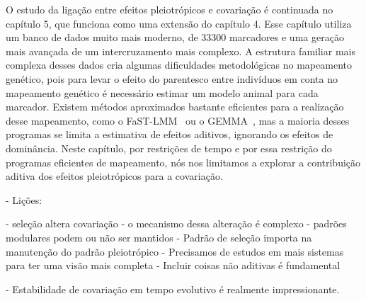\begin{refsection}
O estudo da ligação entre efeitos pleiotrópicos e covariação é continuada no
capítulo 5, que funciona como uma extensão do capítulo 4. Esse capítulo
utiliza um banco de dados muito mais moderno, de 33300 marcadores e uma
geração mais avançada de um intercruzamento mais complexo. A estrutura
familiar mais complexa desses dados cria algumas dificuldades metodológicas no
mapeamento genético, pois para levar o efeito do parentesco entre indivíduos
em conta no mapeamento genético é necessário estimar um modelo animal para
cada marcador. Existem métodos aproximados bastante eficientes para a
realização desse mapeamento, como o FaST-LMM~\parencite{Lippert2011-jn} ou o
GEMMA~\parencite{Zhou2012-zl}, mas a maioria desses programas se limita a
estimativa de efeitos aditivos, ignorando os efeitos de dominância. Neste
capítulo, por restrições de tempo e por essa restrição do programas eficientes
de mapeamento, nós nos limitamos a explorar a contribuição aditiva dos efeitos
pleiotrópicos para a covariação.




- Lições:

	- seleção altera covariação
	- o mecanismo dessa alteração é complexo
		- padrões modulares podem ou não ser mantidos
		- Padrão de seleção importa na manutenção do padrão pleiotrópico
	- Precisamos de estudos em mais sistemas para ter uma visão mais completa
	- Incluir coisas não aditivas é fundamental

- Estabilidade de covariação em tempo evolutivo é realmente impressionante. 




\printbibliography


\end{refsection}